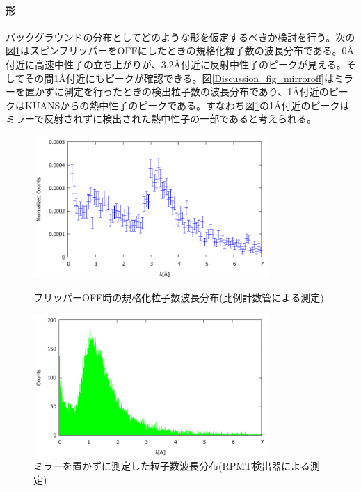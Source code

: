 \paragraph{形}
バックグラウンドの分布としてどのような形を仮定するべきか検討を行う。次の図\ref{Discussion2_fig_flipperoff}はスピンフリッパーをOFFにしたときの規格化粒子数の波長分布である。0\AA 付近に高速中性子の立ち上がりが、3.2\AA 付近に反射中性子のピークが見える。そしてその間1\AA 付近にもピークが確認できる。図\ref{Discussion_fig_mirroroff}はミラーを置かずに測定を行ったときの検出粒子数の波長分布であり、1\AA 付近のピークはKUANSからの熱中性子のピークである。すなわち図\ref{Discussion2_fig_flipperoff}の1\AA 付近のピークはミラーで反射されずに検出された熱中性子の一部であると考えられる。
\begin{figure}[H]
\centering
\includegraphics[width=9cm]{discussion/BG/flipperoff.pdf}
\caption{フリッパーOFF時の規格化粒子数波長分布(比例計数管による測定)}\label{Discussion2_fig_flipperoff}
\includegraphics[width=9cm]{discussion/BG/mirroroff.pdf}
\caption{ミラーを置かずに測定した粒子数波長分布(RPMT検出器による測定)}\label{Discussion2_fig_flipperoff}
\end{figure}

